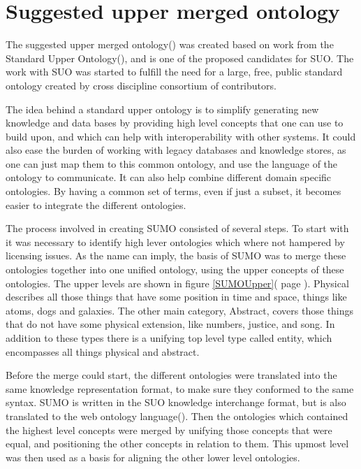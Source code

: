 \section{Suggested upper merged ontology}
The suggested upper merged ontology() was created based on work from the Standard Upper Ontology(),
and is one of the proposed candidates for SUO.
The work with SUO was started to fulfill the need for a large, free, public standard ontology
created by cross discipline consortium of contributors.

The idea behind a standard upper ontology is to simplify generating new knowledge and data bases
by providing high level concepts that one can use to build upon,
and which can help with interoperability with other systems.
It could also ease the burden of working with legacy databases and knowledge stores,
as one can just map them to this common ontology, and use the language of the ontology to communicate.
It can also help combine different domain specific ontologies.
By having a common set of terms, even if just a subset,
it becomes easier to integrate the different ontologies\citep{Niles2001}.

The process involved in creating SUMO consisted of several steps.
To start with it was necessary to identify high lever ontologies which where not hampered by licensing issues.
As the name can imply, the basis of SUMO was to merge these ontologies together into one unified ontology,
using the upper concepts of these ontologies.
The upper levels are shown in figure \ref{SUMOUpper}( page \pageref{SUMOUpper}).
Physical describes all those things that have some position in time and space, things like atoms, dogs and galaxies.
The other main category, Abstract, covers those things that do not have some physical extension, like numbers,
justice, and song.
In addition to these types there is a unifying top level type called entity, which encompasses all things physical and abstract.

Before the merge could start, the different ontologies were translated into the same knowledge representation format,
to make sure they conformed to the same syntax\citep{Niles2001}.
SUMO is written in the SUO knowledge interchange format,
but is also translated to the web ontology language()\citep{Benzmuller2012}.
Then the ontologies which contained the highest level concepts were merged by unifying those concepts that were equal,
and positioning the other concepts in relation to them.
This upmost level was then used as a basis for aligning the other lower level ontologies\citep{Niles2001}.


